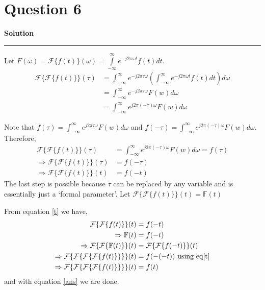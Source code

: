 \documentclass[a4paper]{article}
\title{\cooltitle{CS663 Assignment-3}}
\author{{\bf Saksham Rathi, Kavya Gupta, Shravan Srinivasa Raghavan} \\
\small Department of Computer Science, \\
Indian Institute of Technology Bombay \\}
\date{}
\newenvironment{solution}[2][]{%
    \begin{mdframed}[linecolor=green!60!black, linewidth=2pt, roundcorner=10pt, backgroundcolor=green!5!white, skipabove=12pt, skipbelow=12pt]%
        \textbf{\large #2} %
        \par\noindent\rule{\textwidth}{0.4pt} %
        \vspace{0.5em} %
}{%
    \end{mdframed}%
}
\begin{document}
\maketitle
\section*{Question 6}

\begin{solution}{Solution}
    Let $F(\omega) = \mathcal{F} \{f(t)\}(\omega) = \int\limits_{-\infty}^{\infty} e^{-j2\pi\omega t} f(t)dt$.
    \begin{align*}
        \mathcal{F}\{\mathcal{F}\{f(t)\}\}(\tau) 
        &= \int_{-\infty}^{\infty} e^{-j2\pi\tau\omega} 
        \left( \int_{-\infty}^{\infty} e^{-j2\pi\omega t}f(t) dt \right) d\omega \\
        &= \int_{-\infty}^{\infty} e^{-j2\pi\tau\omega} F(w) d\omega \\
        &= \int_{-\infty}^{\infty} e^{j2\pi(-\tau)\omega} F(w) d\omega
    \end{align*}

    Note that $f(\tau) = \int_{-\infty}^{\infty} e^{j2\pi\tau\omega} F(w) d\omega$ and 
    $f(-\tau) = \int_{-\infty}^{\infty} e^{j2\pi(-\tau)\omega} F(w) d\omega$. Therefore,
    \begin{align}
      \mathcal{F}\{\mathcal{F}\{f(t)\}\}(\tau) &= \int_{-\infty}^{\infty} e^{j2\pi(-\tau)\omega} F(w) d\omega = f(\tau) \nonumber \\
      \Rightarrow \mathcal{F}\{\mathcal{F}\{f(t)\}\}(\tau) &= f(-\tau) \nonumber \\
      \label{t}\Rightarrow \mathcal{F}\{\mathcal{F}\{f(t)\}\}(t) &= f(-t) 
    \end{align}
    The last step is possible because $\tau$ can be replaced by any variable and is essentially just a `formal parameter'. Let
    $\mathcal{F}\{\mathcal{F}\{f(t)\}\}(t) = \mathbb{F}(t)$
    
    From equation \ref{t} we have,
    \begin{align}
      \mathcal{F}\{\mathcal{F}\{f(t)\}\}(t) &= f(-t) \nonumber \\
      \Rightarrow \mathbb{F}(t) &= f(-t) \nonumber \\
      \Rightarrow \mathcal{F}\{\mathcal{F}\{\mathbb{F}(t)\}\}(t) &= \mathcal{F}\{\mathcal{F}\{f(-t)\}\}(t) \nonumber \\
      \Rightarrow \mathcal{F}\{\mathcal{F}\{\mathcal{F}\{\mathcal{F}\{f(t)\}\}\}\}(t) &= f(-(-t)) \text{ using eq\ref{t}}\nonumber \\
      \Rightarrow \label{ans}\mathcal{F}\{\mathcal{F}\{\mathcal{F}\{\mathcal{F}\{f(t)\}\}\}\}(t) &= f(t)
    \end{align}
    and with equation \ref{ans} we are done.
\end{solution}
\end{document}
